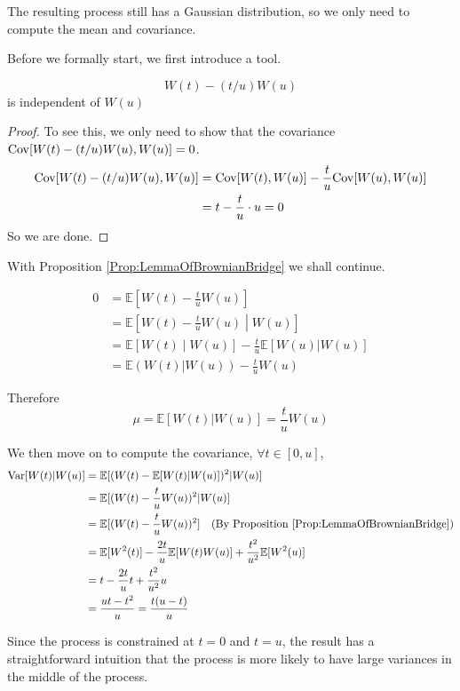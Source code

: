         The resulting process still has a Gaussian distribution, so we only need to compute the mean and covariance.

        Before we formally start, we first introduce a tool.
        \begin{proposition}\label{Prop:LemmaOfBrownianBridge}
            \[ W(t) - (t/u)W(u) \]
            is independent of $W(u)$
        \end{proposition}
        \begin{proof}
            To see this, we only need to show that the covariance $\mathrm{Cov}[W(t)-(t/u)W(u), W(u)] = 0$.
            \begin{align*}
                \mathrm{Cov}[W(t) - (t/u)W(u), W(u)] &= \mathrm{Cov}[W(t),W(u)] - \frac{t}{u}\mathrm{Cov}[W(u), W(u)]\\
                &= t - \frac{t}{u} \cdot u = 0
            \end{align*}
            So we are done.
        \end{proof}

        With Proposition \ref{Prop:LemmaOfBrownianBridge} we shall continue.

        \begin{align*}
            0 &= \mathbb{E}\left[ W(t) - \frac{t}{u}W(u) \right]\\
            &= \mathbb{E}\left[ W(t) - \frac{t}{u} W(u) \middle| W(u) \right]\\
            &= \mathbb{E}\left[ W(t) \middle| W(u) \right] - \frac{t}{u}\mathbb{E}[W(u) | W(u)]\\
            &= \mathbb{E}\left(W(t) | W(u)\right) - \frac{t}{u}W(u)
        \end{align*}

        Therefore
        \[ \mu = \mathbb{E}[W(t)|W(u)] = \frac{t}{u}W(u) \]

        We then move on to compute the covariance, $\forall t \in [0, u]$,
        \begin{align*}
            \mathrm{Var}[W(t) | W(u)] &= \mathbb{E}[(W(t) - \mathbb{E}[W(t)|W(u)])^2 | W(u)]\\
            &= \mathbb{E}[(W(t)- \frac{t}{u}W(u))^2 | W(u)]\\
            &= \mathbb{E}[(W(t) - \frac{t}{u}W(u))^2] \quad \text{(By Proposition \ref{Prop:LemmaOfBrownianBridge})}\\
            &= \mathbb{E}[W^2(t)] - \frac{2t}{u}\mathbb{E}[W(t)W(u)] + \frac{t^2}{u^2}\mathbb{E}[W^2(u)]\\
            &= t - \frac{2t}{u}t + \frac{t^2}{u^2}u\\
            &= \frac{ut - t^2}{u} = \frac{t(u-t)}{u}
        \end{align*}
        \begin{remark}
            Since the process is constrained at $t=0$ and $t=u$, the result has a straightforward intuition that the process is more likely to have large variances in the middle of the process.
        \end{remark}

